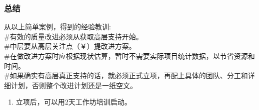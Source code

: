 \hypertarget{ux603bux7ed3}{%
\subsubsection{总结}\label{ux603bux7ed3}}

从以上简单案例，得到的经验教训:\\
\#有效的质量改进必须从获取高层支持开始。\\
\#中层要从高层关注点（￥）提改进方案。\\
\#在做改进方案时应根据现状估算，暂时不需要实际项目统计数据，以节省资源和时间。\\
\#如果确实有高层真正支持的话，就必须正式立项，再配上具体的团队、分工和详细计划，否则整个改进计划还是一纸空文。

\begin{enumerate}
\tightlist
\item
  立项后，可以用2天工作坊培训启动。
\end{enumerate}




